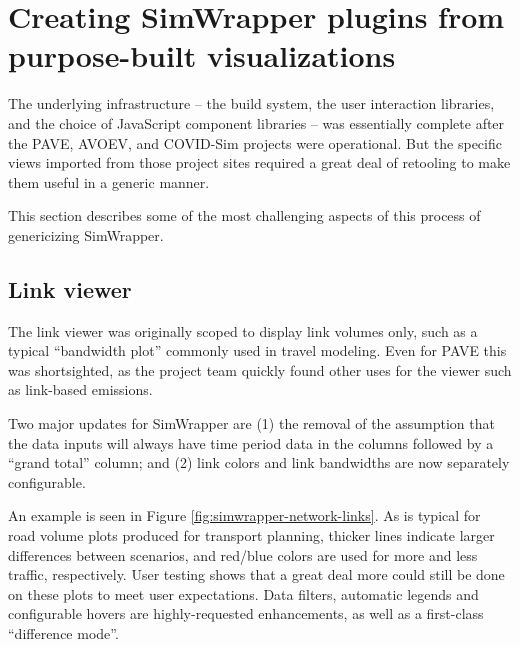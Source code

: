 \hypertarget{simwrapper-converting-purpose-built-visualizations-into-generic-data-viewers}{%
\section{Creating SimWrapper plugins from purpose-built visualizations}
\label{simwrapper-converting-purpose-built-visualizations-into-generic-data-viewers}}

The underlying infrastructure -- the build system, the user interaction libraries, and the choice of JavaScript component libraries -- was essentially complete after the PAVE, AVOEV, and COVID-Sim projects were operational. But the specific views imported from those project sites required a great deal of retooling to make them useful in a generic manner.

This section describes some of the most challenging aspects of this process of genericizing SimWrapper.


\hypertarget{simwrapper-link-viewer}{%
\subsection{Link viewer}\label{simwrapper-link-viewer}}

The link viewer was originally scoped to display link volumes only, such as a typical ``bandwidth plot'' commonly used in travel modeling. Even for PAVE this was shortsighted, as the project team quickly found other uses for the viewer such as link-based emissions.

Two major updates for SimWrapper are (1) the removal of the assumption that the data inputs will always have time period data in the columns followed by a ``grand total'' column; and (2) link colors and link bandwidths are now separately configurable.

An example is seen in Figure \ref{fig:simwrapper-network-links}. As is typical for road volume plots produced for transport planning, thicker lines indicate larger differences between scenarios, and red/blue colors are used for more and less traffic, respectively. User testing shows that a great deal more could still be done on these plots to meet user expectations. Data filters, automatic legends and configurable hovers are highly-requested enhancements, as well as a first-class ``difference mode''.

